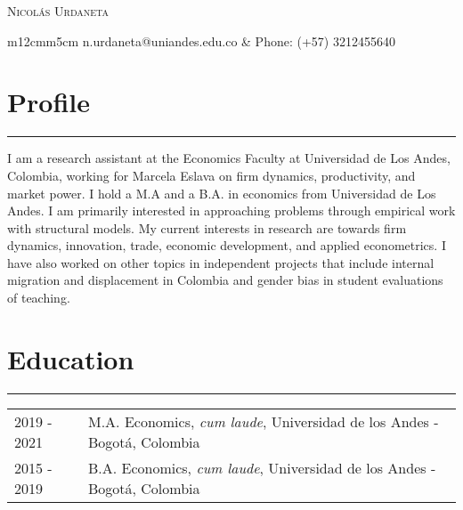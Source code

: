 \documentclass[12pt, letterpaper]{article}
\begin{document}
 

\begin{center}
{\Huge \textsc{Nicolás Urdaneta}}
\vspace*{5mm}

\begin{tabular}{m{12cm}m{5cm}}
\noindent n.urdaneta@uniandes.edu.co & Phone: (+57) 3212455640 \\
\end{tabular}
\vspace*{-9mm}

\end{center}
\section*{Profile}
\vspace*{-8mm}
\noindent \rule{\linewidth}{0.2mm}
\noindent I am a research assistant at the Economics Faculty at Universidad de Los Andes, Colombia, working for Marcela Eslava on firm dynamics, productivity, and market power. I hold a M.A and a B.A. in economics from Universidad de Los Andes. I am primarily interested in approaching problems through empirical work with structural models. My current interests in research are towards firm dynamics, innovation, trade, economic development, and applied econometrics. I have also worked on other topics in independent projects that include internal migration and displacement in Colombia and gender bias in student evaluations of teaching. 

\vspace*{-4mm}

\section*{Education}
\vspace*{-8mm}
\noindent \rule{\linewidth}{0.2mm}
\noindent
\begin{tabular}{@{}p{3cm}p{13.7cm}}
2019 - 2021 &  M.A. Economics, \textit{cum laude}, Universidad de los Andes - Bogotá, Colombia \\
2015 - 2019 & B.A. Economics, \textit{cum laude}, Universidad de los Andes - Bogotá, Colombia
\end{tabular}

\vspace*{-2mm}
\end{document}
